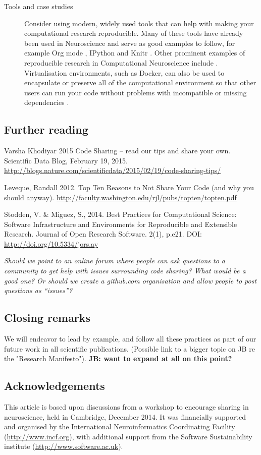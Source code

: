 \documentclass[11pt]{article}
\begin{document}
\begin{description}
\item [Tools and case studies] Consider using modern, widely used tools that can help with making your computational research reproducible.  Many of
  these tools have already been used in Neuroscience and serve as good
  examples to follow, for example Org mode \cite{Delescluse2011},
  IPython \cite{Stevens2013} and Knitr \cite{Eglen2014}.  Other
  prominent examples of reproducible research in Computational
  Neuroscience include \cite{Vogels2011-c8c,Waskom2014-gd}.
  Virtualisation environments, such as Docker, can also be used to
  encapsulate or preserve all of the computational environment so that
  other users can run your code without problems with incompatible or missing dependencies \cite{Boettiger2015}.
  

\end{description}

\subsection*{Further reading}

Varsha Khodiyar 2015 Code Sharing – read our tips and share your own. Scientific Data Blog, February 19, 2015. \url{http://blogs.nature.com/scientificdata/2015/02/19/code-sharing-tips/}

Leveque, Randall 2012. Top Ten Reasons to Not Share Your Code (and why
you should anyway). 
\url{http://faculty.washington.edu/rjl/pubs/topten/topten.pdf}

Stodden, V. & Miguez, S., 2014. Best Practices for Computational Science: Software Infrastructure and Environments for Reproducible and Extensible Research. Journal of Open Research Software. 2(1), p.e21. DOI: \url{http://doi.org/10.5334/jors.ay}

\textit{Should we point to an online forum where people can ask
  questions to a community to get help with issues surrounding code
  sharing?  What would be a good one?  Or should we create a
  github.com organisation and allow people to post questions as
  ``issues''?}


\subsection*{Closing remarks}

We will endeavor to lead by example, and follow all these practices as
part of our future work in all scientific publications.  (Possible
link to a bigger topic on JB re the "Research Manifesto").
\textbf{JB: want to expand at all on this point?}

\subsection*{Acknowledgements}

This article is based upon discussions from a workshop to encourage
sharing in neuroscience, held in Cambridge, December 2014.  It was
financially supported and organised by the International
Neuroinformatics Coordinating Facility (\url{http://www.incf.org}),
with additional support from the Software Sustainability institute
(\url{http://www.software.ac.uk}).



\printbibliography
\end{document}
